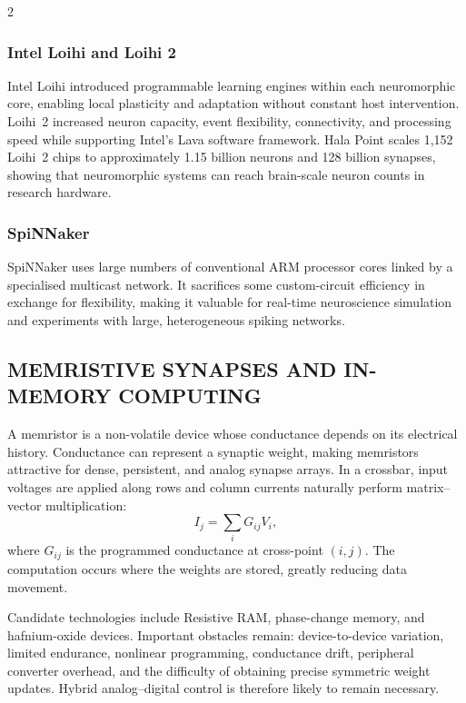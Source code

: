 \begin{multicols}{2}
  \subsubsection*{Intel Loihi and Loihi 2}
  Intel Loihi introduced programmable learning engines within each neuromorphic core, enabling local plasticity and adaptation without constant host intervention. Loihi~2 increased neuron capacity, event flexibility, connectivity, and processing speed while supporting Intel's Lava software framework. Hala Point scales 1,152 Loihi~2 chips to approximately 1.15 billion neurons and 128 billion synapses, showing that neuromorphic systems can reach brain-scale neuron counts in research hardware.

  \subsubsection*{SpiNNaker}
  SpiNNaker uses large numbers of conventional ARM processor cores linked by a specialised multicast network. It sacrifices some custom-circuit efficiency in exchange for flexibility, making it valuable for real-time neuroscience simulation and experiments with large, heterogeneous spiking networks.

  \subsection*{\centering\uppercase{Memristive Synapses and In-Memory Computing}}
  A memristor is a non-volatile device whose conductance depends on its electrical history. Conductance can represent a synaptic weight, making memristors attractive for dense, persistent, and analog synapse arrays. In a crossbar, input voltages are applied along rows and column currents naturally perform matrix--vector multiplication:
  \[
    I_j=\sum_i G_{ij}V_i,
  \]
  where $G_{ij}$ is the programmed conductance at cross-point $(i,j)$. The computation occurs where the weights are stored, greatly reducing data movement.

  \begin{center}
\begin{minipage}{0.98\columnwidth}
\centering
    \arjunMemristorFigure
\end{minipage}
  \end{center}

  {\justifying
  Candidate technologies include Resistive RAM, phase-change memory, and hafnium-oxide devices. Important obstacles remain: device-to-device variation, limited endurance, nonlinear programming, conductance drift, peripheral converter overhead, and the difficulty of obtaining precise symmetric weight updates. Hybrid analog--digital control is therefore likely to remain necessary.\par}


\end{multicols}
